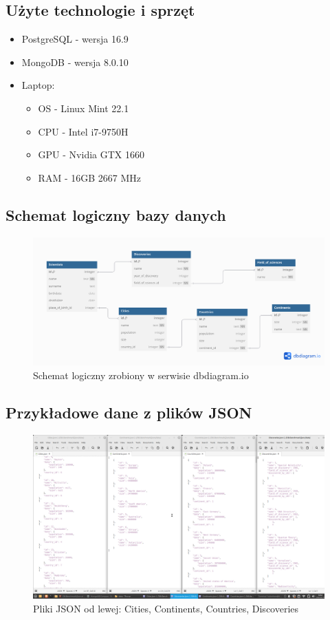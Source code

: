\documentclass[11pt]{article}
\begin{document}
	\subsection{Użyte technologie i sprzęt}
		\begin{itemize}
			\item PostgreSQL - wersja 16.9
			\item MongoDB - wersja 8.0.10
			\item Laptop:
			\begin{itemize}
				\item OS - Linux Mint 22.1
				\item CPU - Intel i7-9750H
				\item GPU - Nvidia GTX 1660
				\item RAM - 16GB 2667 MHz		
			\end{itemize}
		\end{itemize}
	
\newpage
	\subsection{Schemat logiczny bazy danych}
		\begin{figure}[!ht]
			\includegraphics[width=\textwidth]{db-bench.png}
			\caption{Schemat logiczny zrobiony w serwisie dbdiagram.io}
		\end{figure}
	\subsection{Przykładowe dane z plików JSON}
		\begin{figure}[!ht]
			\includegraphics[width=\textwidth]{JSON_examples_1.png}
			\caption{Pliki JSON od lewej: Cities, Continents, Countries, Discoveries}
		\end{figure}
\end{document}
